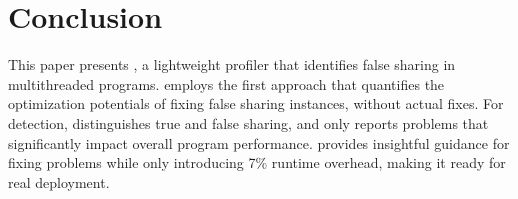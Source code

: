 \section{Conclusion}
\label{sec:conclusion}

This paper presents \cheetah{}, a lightweight profiler that identifies false sharing in multithreaded programs. \cheetah{} employs the first approach that quantifies the optimization potentials of fixing false sharing instances, without actual fixes. For detection, \cheetah{} distinguishes true and false sharing, and only reports problems that significantly impact overall program performance. \cheetah{} provides insightful guidance for fixing problems while only introducing 7\% runtime overhead, making it ready for real deployment. 


